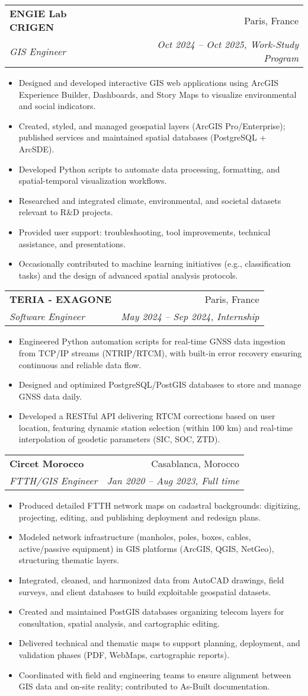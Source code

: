 \documentclass[letterpaper,11pt]{article}
\makeatletter
\newcommand{\resumeItem}[1]{
  \item\small{
    {#1 \vspace{-2pt}}
  }
}
\newcommand{\resumeSubheading}[4]{
  \vspace{-2pt}\item
    \begin{tabular*}{0.97\textwidth}[t]{l@{\extracolsep{\fill}}r}
      \textbf{#1} & #2 \\
      \textit{\small#3} & \textit{\small #4} \\
    \end{tabular*}\vspace{-7pt}
}
\newcommand{\resumeItemListStart}{\begin{itemize}}
\newcommand{\resumeItemListEnd}{\end{itemize}\vspace{-5pt}}
\makeatother
\begin{document}
  \resumeSubheading
    {ENGIE Lab CRIGEN}{Paris, France}
    {GIS Engineer}{Oct 2024 -- Oct 2025, Work-Study Program}
    \resumeItemListStart
      \resumeItem{Designed and developed interactive GIS web applications using ArcGIS Experience Builder, Dashboards, and Story Maps to visualize environmental and social indicators.}
      \resumeItem{Created, styled, and managed geospatial layers (ArcGIS Pro/Enterprise); published services and maintained spatial databases (PostgreSQL + ArcSDE).}
      \resumeItem{ Developed Python scripts to automate data processing, formatting, and spatial-temporal visualization workflows.}
      \resumeItem{ Researched and integrated climate, environmental, and societal datasets relevant to R\&D projects.}
      \resumeItem{ Provided user support: troubleshooting, tool improvements, technical assistance, and presentations.}
      \resumeItem{Occasionally contributed to machine learning initiatives (e.g., classification tasks) and the design of advanced spatial analysis protocols.}
    \resumeItemListEnd

  \resumeSubheading
    {TERIA - EXAGONE}{Paris, France}
    {Software Engineer}{May 2024 -- Sep 2024, Internship}
    \resumeItemListStart
      \resumeItem{Engineered Python automation scripts for real-time GNSS data ingestion from TCP/IP streams (NTRIP/RTCM), with built-in error recovery ensuring continuous and reliable data flow.}
      \resumeItem{Designed and optimized PostgreSQL/PostGIS databases to store and manage GNSS data daily.}
      \resumeItem{Developed a RESTful API delivering RTCM corrections based on user location, featuring dynamic station selection (within 100 km) and real-time interpolation of geodetic parameters (SIC, SOC, ZTD).}
    \resumeItemListEnd

  \resumeSubheading
    {Circet Morocco}{Casablanca, Morocco}
    {FTTH/GIS Engineer}{Jan 2020 -- Aug 2023, Full time}
    \resumeItemListStart
      \resumeItem{Produced detailed FTTH network maps on cadastral backgrounds: digitizing, projecting, editing, and publishing deployment and redesign plans.}
      \resumeItem{Modeled network infrastructure (manholes, poles, boxes, cables, active/passive equipment) in GIS platforms (ArcGIS, QGIS, NetGeo), structuring thematic layers.}
      \resumeItem{Integrated, cleaned, and harmonized data from AutoCAD drawings, field surveys, and client databases to build exploitable geospatial datasets.}
      \resumeItem{Created and maintained PostGIS databases organizing telecom layers for consultation, spatial analysis, and cartographic editing.}
      \resumeItem{Delivered technical and thematic maps to support planning, deployment, and validation phases (PDF, WebMaps, cartographic reports).}
      \resumeItem{Coordinated with field and engineering teams to ensure alignment between GIS data and on-site reality; contributed to As-Built documentation.}
    \resumeItemListEnd
\end{document}
